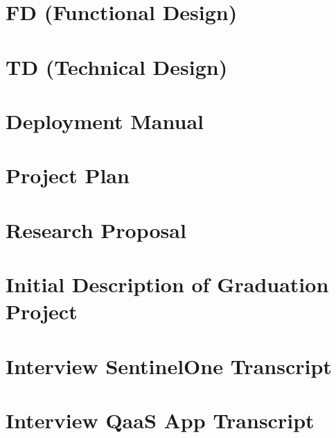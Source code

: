 \appendix

\chapter{FD (Functional Design)} \label{appendix:fd}

\newpage

\chapter{TD (Technical Design)} \label{appendix:technical-design}

\newpage

\chapter{Deployment Manual} \label{appendix:deployment-manual}



\chapter{Project Plan} \label{appendix:project-plan}

\newpage

\chapter{Research Proposal}

\newpage

\chapter{Initial Description of Graduation Project}

\newpage


\chapter{Interview SentinelOne Transcript}

\newpage

\chapter{Interview QaaS App Transcript}

\newpage
